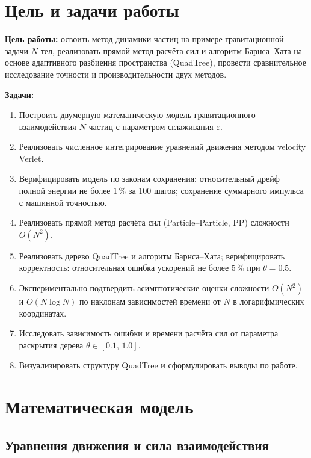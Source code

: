 \documentclass[12pt,a4paper]{article}
\begin{document}
	
\tableofcontents
\newpage
	
	\section{Цель и задачи работы}
	
	\textbf{Цель работы:} освоить метод динамики частиц на примере гравитационной задачи $N$ тел, реализовать прямой метод расчёта сил и алгоритм Барнса--Хата на основе адаптивного разбиения пространства (QuadTree), провести сравнительное исследование точности и производительности двух методов.
	
	\textbf{Задачи:}
	\begin{enumerate}
		\item Построить двумерную математическую модель гравитационного взаимодействия $N$ частиц с параметром сглаживания $\varepsilon$.
		\item Реализовать численное интегрирование уравнений движения методом velocity Verlet.
		\item Верифицировать модель по законам сохранения: относительный дрейф полной энергии не более $1\,\%$ за 100 шагов; сохранение суммарного импульса с машинной точностью.
		\item Реализовать прямой метод расчёта сил (Particle--Particle, PP) сложности $O(N^2)$.
		\item Реализовать дерево QuadTree и алгоритм Барнса--Хата; верифицировать корректность: относительная ошибка ускорений не более $5\,\%$ при $\theta = 0.5$.
		\item Экспериментально подтвердить асимптотические оценки сложности $O(N^2)$ и $O(N\log N)$ по наклонам зависимостей времени от $N$ в логарифмических координатах.
		\item Исследовать зависимость ошибки и времени расчёта сил от параметра раскрытия дерева $\theta \in [0.1,\,1.0]$.
		\item Визуализировать структуру QuadTree и сформулировать выводы по работе.
	\end{enumerate}
	
	\section{Математическая модель}
	
	\subsection{Уравнения движения и сила взаимодействия}
	
\end{document}
